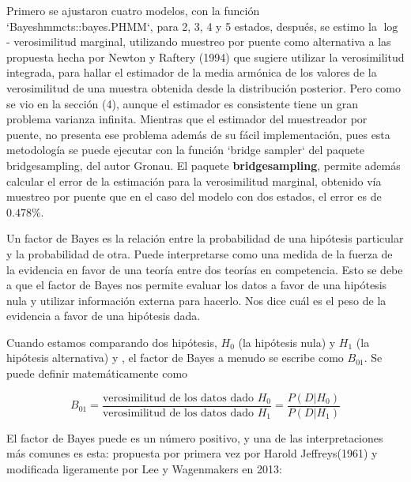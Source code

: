 \documentclass[a4paper]{article}\usepackage[]{graphicx}\usepackage[]{color}
\begin{document}
Primero se ajustaron cuatro modelos, con la función `Bayeshmmcts::bayes.PHMM`, para 2, 3, 4 y 5 estados, después, se estimo la $\log$ - verosimilitud marginal, utilizando muestreo por puente como alternativa a las propuesta hecha por Newton y Raftery (1994) que sugiere utilizar la verosimilitud integrada, para hallar el estimador de la media armónica de los valores de la verosimilitud de una muestra obtenida desde la distribución posterior. Pero como se vio en la sección (4), aunque el estimador es consistente tiene un gran problema varianza infinita. Mientras que el estimador del muestreador por puente, no presenta ese problema además de su fácil implementación, pues esta metodología se puede ejecutar con la función `bridge sampler` del paquete bridgesampling, del autor Gronau. El paquete \textbf{bridgesampling}, permite además calcular el error de la estimación para la verosimilitud marginal, obtenido vía muestreo por puente que en el caso del modelo con dos estados, el error es de $0.478 \%$. 

Un factor de Bayes es la relación entre la probabilidad de una hipótesis particular y la probabilidad de otra. Puede interpretarse como una medida de la fuerza de la evidencia en favor de una teoría entre dos teorías en competencia. Esto se debe a que el factor de Bayes nos permite evaluar los datos a favor de una hipótesis nula y utilizar información externa para hacerlo. Nos dice cuál es el peso de la evidencia a favor de una hipótesis dada.

Cuando estamos comparando dos hipótesis, $H_0$ (la hipótesis nula) y $H_1$ (la hipótesis alternativa) y , el factor de Bayes a menudo se escribe como $B_{01}$. Se puede definir matemáticamente como

$$B_{01} = \frac{\text{verosimilitud de los datos dado $H_0$}}{\text{verosimilitud de los datos dado $H_1$}} = \frac{P(D | H_0)}{P(D | H_1)}$$

El factor de Bayes puede es un número positivo, y una de las interpretaciones más comunes es esta: propuesta por primera vez por Harold Jeffreys(1961) y modificada ligeramente por Lee y Wagenmakers en 2013:
\end{document}
